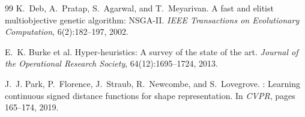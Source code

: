 \documentclass[11pt, a4paper]{article}
\begin{document}
\begin{thebibliography}{99}
K.~Deb, A.~Pratap, S.~Agarwal, and T.~Meyarivan.
\newblock A fast and elitist multiobjective genetic algorithm: {NSGA-II}.
\newblock \emph{IEEE Transactions on Evolutionary Computation}, 6(2):182--197,
  2002.

E.~K. Burke et al.
\newblock Hyper-heuristics: A survey of the state of the art.
\newblock \emph{Journal of the Operational Research Society},
  64(12):1695--1724, 2013.

J.~J. Park, P.~Florence, J.~Straub, R.~Newcombe, and S.~Lovegrove.
: Learning continuous signed distance functions for shape
  representation.
\newblock In \emph{CVPR}, pages 165--174, 2019.

\end{thebibliography}
\end{document}
